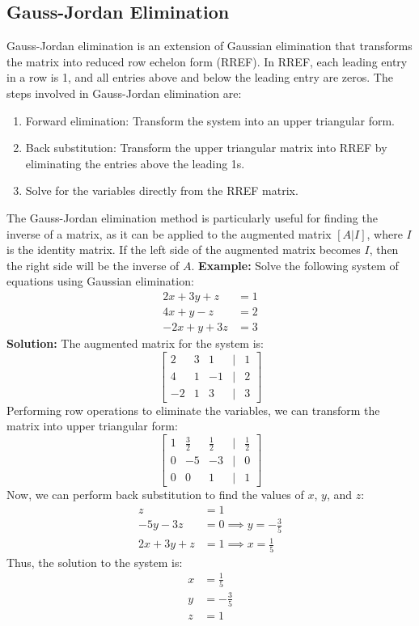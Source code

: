 \subsection{Gauss-Jordan Elimination}
Gauss-Jordan elimination is an extension of Gaussian elimination that transforms the matrix into reduced row echelon form (RREF). In RREF, each leading entry in a row is 1, and all entries above and below the leading entry are zeros. The steps involved in Gauss-Jordan elimination are:
\begin{enumerate}
	\item Forward elimination: Transform the system into an upper triangular form.
	\item Back substitution: Transform the upper triangular matrix into RREF by eliminating the entries above the leading 1s.
	\item Solve for the variables directly from the RREF matrix.
\end{enumerate}
The Gauss-Jordan elimination method is particularly useful for finding the inverse of a matrix, as it can be applied to the augmented matrix \([A | I]\), where \(I\) is the identity matrix. If the left side of the augmented matrix becomes \(I\), then the right side will be the inverse of \(A\).
\textbf{Example:} Solve the following system of equations using Gaussian elimination:
\begin{align*}
	2x + 3y + z  & = 1 \\
	4x + y - z   & = 2 \\
	-2x + y + 3z & = 3
\end{align*}
\textbf{Solution:} The augmented matrix for the system is:
\begin{equation*}
	\begin{bmatrix}
		2  & 3 & 1  & | & 1 \\
		4  & 1 & -1 & | & 2 \\
		-2 & 1 & 3  & | & 3
	\end{bmatrix}
\end{equation*}
Performing row operations to eliminate the variables, we can transform the matrix into upper triangular form:
\begin{equation*}
	\begin{bmatrix}
		1 & \frac{3}{2} & \frac{1}{2} & | & \frac{1}{2} \\
		0 & -5          & -3          & | & 0           \\
		0 & 0           & 1           & | & 1
	\end{bmatrix}
\end{equation*}
Now, we can perform back substitution to find the values of \(x\), \(y\), and \(z\):
\begin{align*}
	z           & = 1                           \\
	-5y - 3z    & = 0 \implies y = -\frac{3}{5} \\
	2x + 3y + z & = 1 \implies x = \frac{1}{5}
\end{align*}
Thus, the solution to the system is:
\begin{align*}
	x & = \frac{1}{5}  \\
	y & = -\frac{3}{5} \\
	z & = 1
\end{align*}
